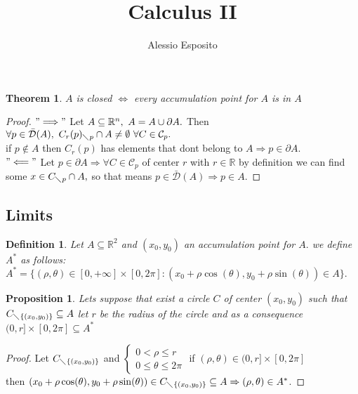 \documentclass{article}
\title{Calculus II}
\author{Alessio Esposito}
\newtheorem{theorem}{Theorem}
\newtheorem{definition}{Definition}
\newtheorem{proposition}{Proposition}
\begin{document}
\maketitle

    \begin{theorem}
        $A$ is closed $\Longleftrightarrow$ every accumulation point for $A$ is in $A$ \hfill    
    \end{theorem}
    \begin{proof}
        $"\Longrightarrow"$ Let $A \subseteq \mathbb{R}^n, \ A = A \cup \partial A. \\$ Then $\forall  p \in \bar{\mathcal{D}} (A), \ C_r(p)_{\diagdown p}\cap A \neq \emptyset \ \forall  C \in \mathcal{C}_p.$ \\
        if $ p \notin A $ then $C_r(p)$ has elements that dont belong to $A \Rightarrow p \in \partial A.$ \\
        $"\Longleftarrow"$ Let $p \in \partial A \Rightarrow \forall C \in \mathcal{C}_p$ of center $r$ with $r \in \mathbb{R}$ by definition we can find some $x \in C_{\diagdown p} \cap A, $ so that means $p \in \bar{\mathcal{D}} (A) \Rightarrow p \in A.$       
    \end{proof}

\subsection*{Limits}

    \begin{definition}
        Let $A \subseteq \mathbb{R}^2$ and $(x_0,y_0)$ an accumulation point for $A.$ we define $A^*$ as follows: \\ 
        $A^* = \{(\rho , \theta) \in [0, +\infty ] \times [0, 2\pi] : (x_0 + \rho \cos(\theta), y_0 + \rho \sin(\theta)) \in A \}.$

    \end{definition}
        
    \begin{proposition}
        Lets suppose that exist a circle $C$ of center $(x_0,y_0)$ such that $C_{\diagdown \{ (x_0,y_0) \}} \subseteq A$ let $r$ be the radius of the circle and as a consequence $(0,r] \times [0,2\pi] \subseteq A^*$
    \end{proposition}
    
    \begin{proof}
        Let $C_{\diagdown \{ (x_0,y_0) \}}$ and
            $\begin{cases}
                0 < \rho \leqslant r \\
                0 \leqslant \theta \leqslant 2\pi
            \end{cases}$
            if $(\rho, \theta) \in (0,r] \times [0,2\pi]$ \\ then $(x_0 + \rho \cos(\theta), y_0 + \rho \sin(\theta)) \in C_{\diagdown \{ (x_0,y_0) \}} \subseteq A \Rightarrow (\rho, \theta) \in A^*$.
    \end{proof}
        
\end{document}

